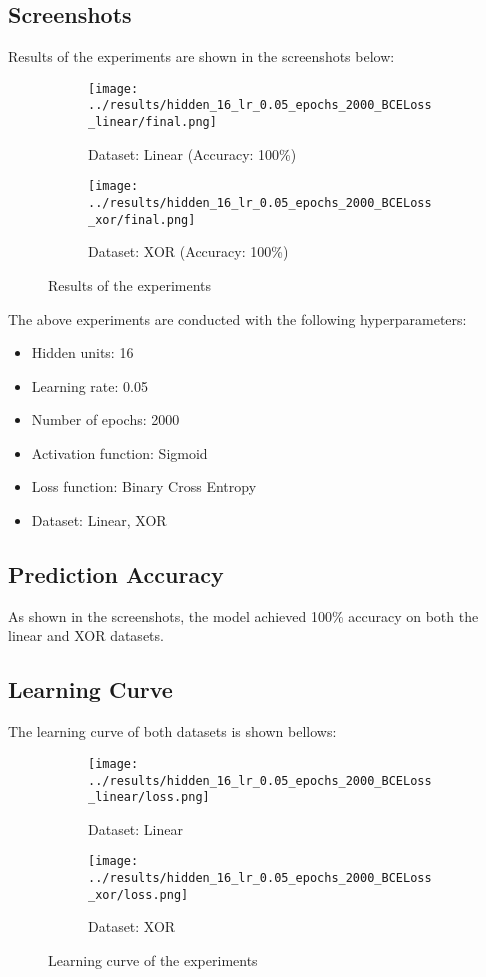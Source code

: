 \subsection{Screenshots}

Results of the experiments are shown in the screenshots below:

\begin{figure}[H]
    \centering
    \begin{subfigure}{0.5\textwidth}
        \centering
        \texttt{[image: ../results/hidden\_16\_lr\_0.05\_epochs\_2000\_BCELoss\_linear/final.png]}
        \caption{Dataset: Linear (Accuracy: 100\%)}
    \end{subfigure}%
    \begin{subfigure}{0.5\textwidth}
        \centering
        \texttt{[image: ../results/hidden\_16\_lr\_0.05\_epochs\_2000\_BCELoss\_xor/final.png]}
        \caption{Dataset: XOR (Accuracy: 100\%)}
    \end{subfigure}
    \caption{Results of the experiments}
\end{figure}

The above experiments are conducted with the following hyperparameters:

\begin{itemize}
    \item Hidden units: 16
    \item Learning rate: 0.05
    \item Number of epochs: 2000
    \item Activation function: Sigmoid
    \item Loss function: Binary Cross Entropy
    \item Dataset: Linear, XOR
\end{itemize}


\subsection{Prediction Accuracy}


As shown in the screenshots, the model achieved 100\% accuracy on both the linear and XOR datasets.

\subsection{Learning Curve}


The learning curve of both datasets is shown bellows:

\begin{figure}[H]
    \centering
    \begin{subfigure}[b]{0.45\textwidth}
        \centering
        \texttt{[image: ../results/hidden\_16\_lr\_0.05\_epochs\_2000\_BCELoss\_linear/loss.png]}
        \caption{Dataset: Linear}
    \end{subfigure}
    \begin{subfigure}[b]{0.45\textwidth}
        \centering
        \texttt{[image: ../results/hidden\_16\_lr\_0.05\_epochs\_2000\_BCELoss\_xor/loss.png]}
        \caption{Dataset: XOR}
    \end{subfigure}
    \caption{Learning curve of the experiments}
\end{figure}
